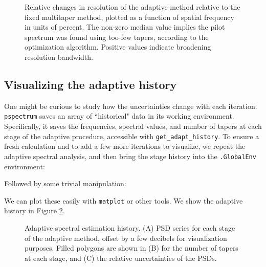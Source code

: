 \documentclass[10pt]{article}\usepackage[]{graphicx}\usepackage[]{color}
\newcommand{\Rcmd}[1]{\texttt{#1}}
\begin{document}
\begin{figure}[!htbp]
\begin{center}

\caption{Relative changes in resolution of the adaptive method
relative to the fixed multitaper method, plotted
as a function of spatial frequency in units of percent. 
The non-zero median value implies the pilot spectrum was found using too-few tapers,
according to the optimization algorithm.  Positive values indicate broadening
resolution bandwidth.
}
\label{fig:magres}
\end{center}
\end{figure}

\clearpage

\subsection{Visualizing the adaptive history}
One might be curious to study how the uncertainties change with each iteration.
\Rcmd{pspectrum} saves an array of ``historical" data in its working environment.
Specifically, it saves the frequencies, spectral values, and number of tapers at each stage of the adaptive
procedure, accessible with \Rcmd{get\_adapt\_history}. To ensure a fresh calculation and to 
add a few more iterations to visualize, we repeat the adaptive spectral analysis, 
and then bring the stage history into the \Rcmd{.GlobalEnv} environment:

Followed by some trivial manipulation:

We can plot these easily with \Rcmd{matplot} or other tools.  We show
the adaptive history in Figure \ref{fig:psdhist}.  

\begin{figure}[!htbp]
\begin{center}




\caption{Adaptive spectral estimation history.
(A) PSD series for each stage of the adaptive method, 
offset by a few decibels for visualization purposes.
Filled polygons are shown in (B) for the number of tapers at each stage,
and (C) the relative uncertainties of the PSDs.
}
\label{fig:psdhist}
\end{center}
\end{figure}

\clearpage

\end{document}
